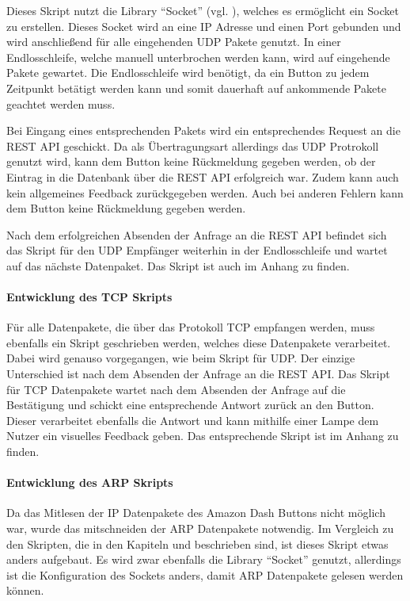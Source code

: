 Dieses Skript nutzt die Library ``Socket'' (vgl. \cite{.20.02.2017}), welches es ermöglicht ein Socket zu erstellen. Dieses Socket wird an eine \ac{IP} Adresse und einen Port gebunden und wird anschließend für alle eingehenden \ac{UDP} Pakete genutzt. In einer Endlosschleife, welche manuell unterbrochen werden kann, wird auf eingehende Pakete gewartet. Die Endlosschleife wird benötigt, da ein Button zu jedem Zeitpunkt betätigt werden kann und somit dauerhaft auf ankommende Pakete geachtet werden muss. 

Bei Eingang eines entsprechenden Pakets wird ein entsprechendes Request an die \ac{REST} \ac{API} geschickt. Da als Übertragungsart allerdings das UDP Protrokoll genutzt wird, kann dem Button keine Rückmeldung gegeben werden, ob der Eintrag in die Datenbank über die \ac{REST} \ac{API} erfolgreich war. Zudem kann auch kein allgemeines Feedback zurückgegeben werden. Auch bei anderen Fehlern kann dem Button keine Rückmeldung gegeben werden. 

Nach dem erfolgreichen Absenden der Anfrage an die \ac{REST} \ac{API} befindet sich das Skript für den \ac{UDP} Empfänger weiterhin in der Endlosschleife und wartet auf das nächste Datenpaket. 
Das Skript ist auch im Anhang zu finden. 

\paragraph{Entwicklung des TCP Skripts}$\;$ \\  
\label{sec:Entwicklung des TCP Skripts-1} 
Für alle Datenpakete, die über das Protokoll \ac{TCP} empfangen werden, muss ebenfalls ein Skript geschrieben werden, welches diese Datenpakete verarbeitet. Dabei wird genauso vorgegangen, wie beim Skript für UDP. Der einzige Unterschied ist nach dem Absenden der Anfrage an die \ac{REST} \ac{API}. Das Skript für \ac{TCP} Datenpakete wartet nach dem Absenden der Anfrage auf die Bestätigung und schickt eine entsprechende Antwort zurück an den Button. Dieser verarbeitet ebenfalls die Antwort und kann mithilfe einer Lampe dem Nutzer ein visuelles Feedback geben. 
Das entsprechende Skript ist im Anhang zu finden.

\paragraph{Entwicklung des ARP Skripts}$\;$ \\  
\label{sec:Entwicklung des ARP Skripts-1} 
Da das Mitlesen der \ac{IP} Datenpakete des Amazon Dash Buttons nicht möglich war, wurde das mitschneiden der \ac{ARP} Datenpakete notwendig. 
Im Vergleich zu den Skripten, die in den Kapiteln  und  beschrieben sind, ist dieses Skript etwas anders aufgebaut. Es wird zwar ebenfalls die Library ``Socket'' genutzt, allerdings ist die Konfiguration des Sockets anders, damit \ac{ARP} Datenpakete gelesen werden können. 


